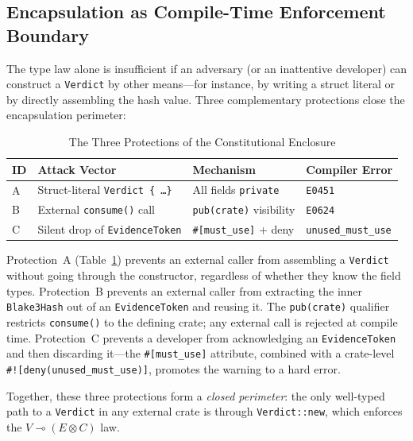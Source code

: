 \subsection{Encapsulation as Compile-Time Enforcement Boundary}
\label{sec:encapsulation}

The type law alone is insufficient if an adversary (or an
inattentive developer) can construct a \texttt{Verdict} by other
means---for instance, by writing a struct literal or by directly
assembling the hash value.  Three complementary protections close
the encapsulation perimeter:

\begin{table}[t]
\caption{The Three Protections of the Constitutional Enclosure}
\label{tab:protections}
\begin{tabular}{llll}
\hline
\textbf{ID} & \textbf{Attack Vector} & \textbf{Mechanism} & \textbf{Compiler Error} \\
\hline
A & Struct-literal \texttt{Verdict \{ \ldots \}} &
  All fields \texttt{private} & \texttt{E0451} \\
B & External \texttt{consume()} call &
  \texttt{pub(crate)} visibility & \texttt{E0624} \\
C & Silent drop of \texttt{EvidenceToken} &
  \texttt{\#[must\_use]} + deny & \texttt{unused\_must\_use} \\
\hline
\end{tabular}
\end{table}

Protection~A (Table~\ref{tab:protections}) prevents an external
caller from assembling a \texttt{Verdict} without going through the
constructor, regardless of whether they know the field types.
Protection~B prevents an external caller from extracting the inner
\texttt{Blake3Hash} out of an \texttt{EvidenceToken} and reusing it.
The \texttt{pub(crate)} qualifier restricts \texttt{consume()} to
the defining crate; any external call is rejected at compile time.
Protection~C prevents a developer from acknowledging an
\texttt{EvidenceToken} and then discarding it---the \texttt{\#[must\_use]}
attribute, combined with a crate-level \texttt{\#![deny(unused\_must\_use)]},
promotes the warning to a hard error.

Together, these three protections form a \emph{closed perimeter}: the
only well-typed path to a \texttt{Verdict} in any external crate is
through \texttt{Verdict::new}, which enforces the $V \multimap (E \otimes C)$
law.

